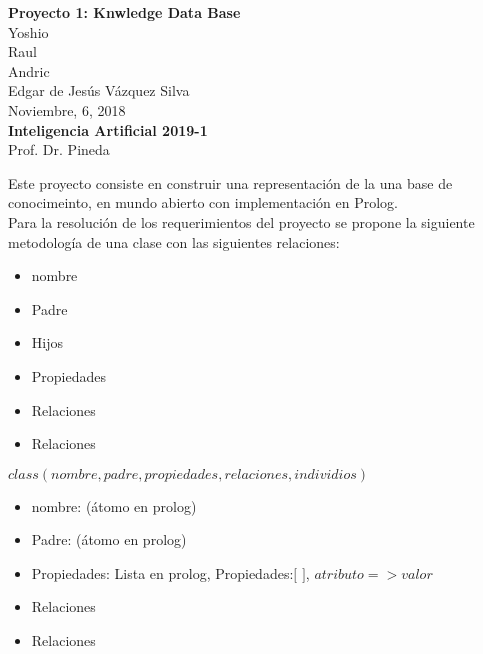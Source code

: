 \documentclass[letterpaper,11pt]{article}
\author{Edgar de Jesús Vázquez Silva}
\begin{document}
\setlength{\parskip}{0cm}
\begin{center}
{\bf \large Proyecto 1: Knwledge Data Base}\\
Yoshio \\
Raul\\
Andric\\
Edgar de Jesús Vázquez Silva\\
Noviembre, 6,  2018\\
\vspace{0.2in}
\textbf{Inteligencia Artificial  2019-1}\\
Prof. Dr. Pineda\\
\end{center}

\vspace{\baselineskip}

Este proyecto consiste en construir una representación de la una base de conocimeinto,
en mundo abierto con implementación en Prolog.\\

Para la resolución de los requerimientos del proyecto se propone la siguiente metodología 
de una clase con las siguientes relaciones:\\

\begin{itemize}
  \item{nombre}
  \item{Padre}
  \item{Hijos}
  \item{Propiedades}
  \item{Relaciones}
  \item{Relaciones}
\end{itemize}

$class(nombre, padre, propiedades, relaciones, individios)$\\

\begin{itemize}
  \item{nombre: (átomo en prolog)}
  \item{Padre: (átomo en prolog)}
  \item{Propiedades: Lista en prolog, Propiedades:$[$     $]$, $atributo => valor$}
  \item{Relaciones}
  \item{Relaciones}
\end{itemize}
\end{document}
